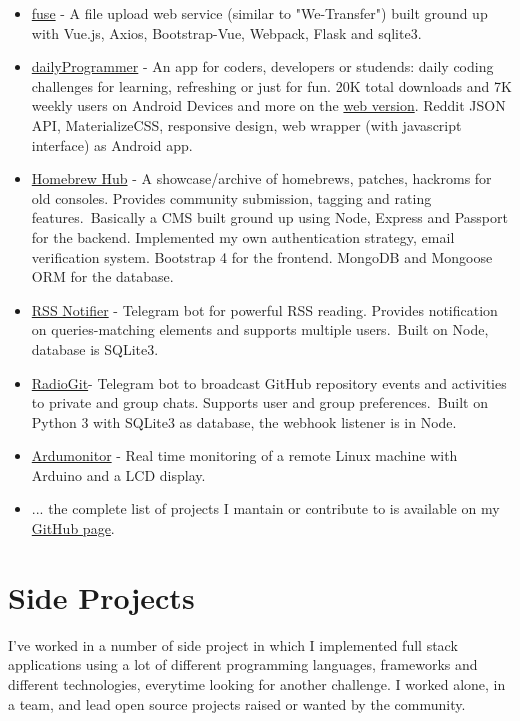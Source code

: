 \documentclass[11pt]{res} %
\begin{document}
\begin{resume}
\begin{itemize}
\item \href{https://github.com/avivace/fuse}{fuse} - A file upload web service (similar to "We-Transfer") built ground up with Vue.js, Axios, Bootstrap-Vue, Webpack, Flask and sqlite3.
\item \href{https://play.google.com/store/apps/details?id=avivace.daily_programmer}{dailyProgrammer} - An app for coders, developers or studends: daily coding challenges for learning, refreshing or just for fun.
20K total downloads and 7K weekly users on Android Devices and more on the \href{https://dp.avivace.com/}{web version}.
Reddit JSON API, MaterializeCSS, responsive design, web wrapper (with javascript interface) as Android app.
\item \href{https://gbhh.avivace.com}{Homebrew Hub} - A showcase/archive of homebrews, patches, hackroms for old consoles. Provides community submission, tagging and rating features.\
Basically a CMS built ground up using Node, Express and Passport for the backend. Implemented my own authentication strategy, email verification system. Bootstrap 4 for the frontend. MongoDB and Mongoose ORM for the database.
\item \href{https://github.com/avivace/rssnotifier}{RSS Notifier}  - Telegram bot for powerful RSS reading. Provides notification on queries-matching elements and supports multiple users.\ Built on Node, database is SQLite3.
\item \href{https://github.com/avivace/radiogit}{RadioGit}- Telegram bot to broadcast GitHub repository events and activities to private and group chats. Supports user and group preferences.\
Built on Python 3 with SQLite3 as database, the webhook listener is in Node.
\item \href{https://github.com/avivace/ardumonitor}{Ardumonitor} - Real time monitoring of a remote Linux machine with Arduino and a LCD display.
\item ... the complete list of projects I mantain or contribute to is available on my \href{https://github.com/avivace}{GitHub page}.

\end{itemize}

\section{Side Projects}
I've worked in a number of side project in which I implemented full stack applications using a lot of different programming languages, frameworks and different technologies, everytime looking for another challenge. I worked alone, in a team, and lead open source projects raised or wanted by the community.


\end{resume}
\end{document}

